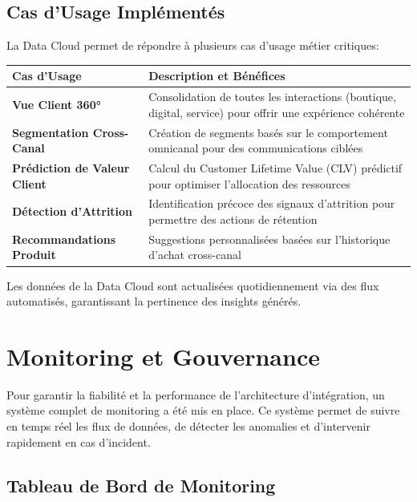 \subsection{Cas d'Usage Implémentés}

La Data Cloud permet de répondre à plusieurs cas d'usage métier critiques:

\begin{center}
\begin{tabular}{|>{\bfseries}p{5cm}|p{10cm}|}
\hline
\rowcolor{lightblue} Cas d'Usage & Description et Bénéfices \\
\hline
Vue Client 360° & Consolidation de toutes les interactions (boutique, digital, service) pour offrir une expérience cohérente \\
\hline
Segmentation Cross-Canal & Création de segments basés sur le comportement omnicanal pour des communications ciblées \\
\hline
Prédiction de Valeur Client & Calcul du Customer Lifetime Value (CLV) prédictif pour optimiser l'allocation des ressources \\
\hline
Détection d'Attrition & Identification précoce des signaux d'attrition pour permettre des actions de rétention \\
\hline
Recommandations Produit & Suggestions personnalisées basées sur l'historique d'achat cross-canal \\
\hline
\end{tabular}
\end{center}

Les données de la Data Cloud sont actualisées quotidiennement via des flux automatisés, garantissant la pertinence des insights générés.

\section{Monitoring et Gouvernance}

\begin{mdframed}[style=breakablegreen]
Pour garantir la fiabilité et la performance de l'architecture d'intégration, un système complet de monitoring a été mis en place. Ce système permet de suivre en temps réel les flux de données, de détecter les anomalies et d'intervenir rapidement en cas d'incident.
\end{mdframed}

\subsection{Tableau de Bord de Monitoring}

